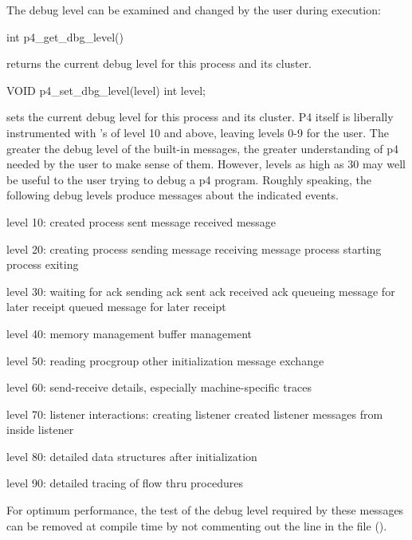 The debug level can be examined and changed by the user during execution:

\begin{example}
int p4_get_dbg_level()     
\end{example}
\noindent
returns the current debug level for this process and its cluster.

\begin{example}
VOID p4_set_dbg_level(level)     
int level;
\end{example}
\noindent
sets the current debug level for this process and its cluster.
P4 itself is liberally instrumented with 's of level
10 and above, leaving levels 0-9 for the user.  The greater the debug
level of the built-in messages, the greater understanding of p4 needed
by the user to make sense of them.  However, levels as high as 30 may
well be useful to the user trying to debug a p4 program.
Roughly speaking, the following debug levels produce messages about the
indicated events.

\begin{example}
level 10:  created process
           sent message
           received message

level 20:  creating process
           sending message
           receiving message
           process starting
           process exiting

level 30:  waiting for ack
           sending ack
           sent ack
           received ack
           queueing message for later receipt
           queued message for later receipt

level 40:  memory management
           buffer management

level 50:  reading procgroup
           other initialization message exchange

level 60:  send-receive details, especially machine-specific traces

level 70:  listener interactions:
            creating listener
            created listener
            messages from inside listener

level 80:  detailed data structures after initialization

level 90:  detailed tracing of flow thru procedures
\end{example}

For optimum performance, the test of the debug level required by these
messages can be removed at compile time by not commenting out the 
 line in the 
file ().


